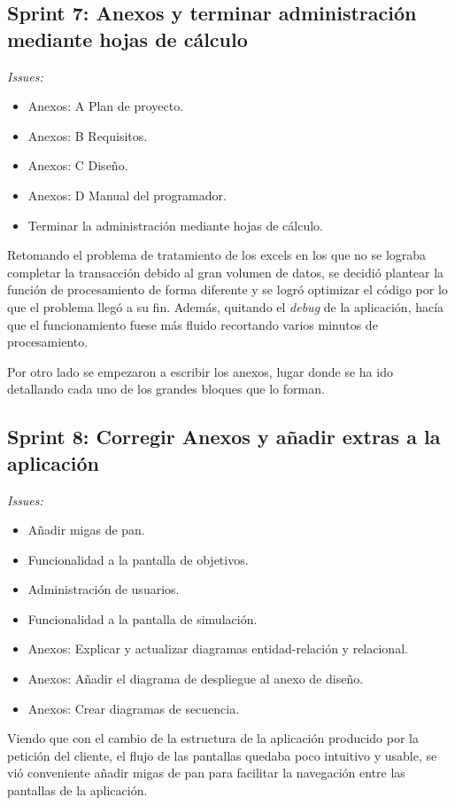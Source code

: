 \subsection{Sprint 7: Anexos y terminar administración mediante hojas de cálculo}
\textit{Issues:}
\begin{itemize}
	\item Anexos: A Plan de proyecto.
	\item Anexos: B Requisitos.
	\item Anexos: C Diseño.
	\item Anexos: D Manual del programador.
	\item Terminar la administración mediante hojas de cálculo.
\end{itemize}

Retomando el problema de tratamiento de los excels en los que no se lograba completar la transacción debido al gran volumen de datos, se decidió plantear la función de procesamiento de forma diferente y se logró optimizar el código por lo que el problema llegó a su fin. Además, quitando el \textit{debug} de la aplicación, hacía que el funcionamiento fuese más fluido recortando varios minutos de procesamiento.

Por otro lado se empezaron a escribir los anexos, lugar donde se ha ido detallando cada uno de los grandes bloques que lo forman.

\subsection{Sprint 8: Corregir Anexos y añadir extras a la aplicación}
\textit{Issues:}
\begin{itemize}
	\item Añadir migas de pan.
	\item Funcionalidad a la pantalla de objetivos.
	\item Administración de usuarios.
	\item Funcionalidad a la pantalla de simulación.
	\item Anexos: Explicar y actualizar diagramas entidad-relación y relacional.
	\item Anexos: Añadir el diagrama de despliegue al anexo de diseño.
	\item Anexos: Crear diagramas de secuencia.
\end{itemize}

Viendo que con el cambio de la estructura de la aplicación producido por la petición del cliente, el flujo de las pantallas quedaba poco intuitivo y usable, se vió conveniente añadir migas de pan para facilitar la navegación entre las pantallas de la aplicación. 


